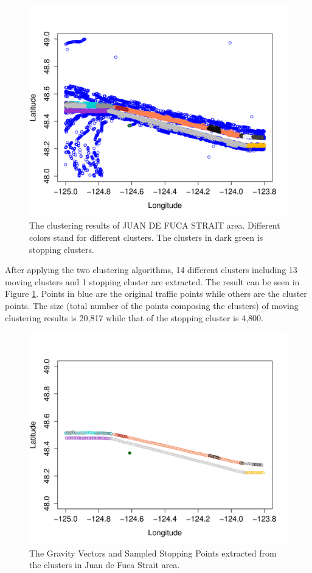 \documentclass[12pt,glossary]{dalcsthesis}
\begin{document}
\begin{figure}[!htb]
\centering
\includegraphics[width=5in]{clusterResultJDFK.png}
\caption{The clustering results of JUAN DE FUCA STRAIT area. Different colors stand for different clusters. The clusters in dark green is stopping clusters.}
\label{fig:jdfk_cluster}
\end{figure}

After applying the two clustering algorithms, 14 different clusters including 13 moving clusters and 1 stopping cluster are extracted. The result can be seen in Figure \ref{fig:jdfk_cluster}. Points in blue are the original traffic points while others are the cluster points. The size (total number of the points composing the clusters) of moving clustering results is 20,817 while that of the stopping cluster is 4,800.


\begin{figure}[!htb]
\centering
\includegraphics[width=5in]{clusterGV.jpg}
\caption{The Gravity Vectors and Sampled Stopping Points extracted from the clusters in Juan de Fuca Strait area.}
\label{fig:jdfk_gv}
\end{figure}
\end{document}
